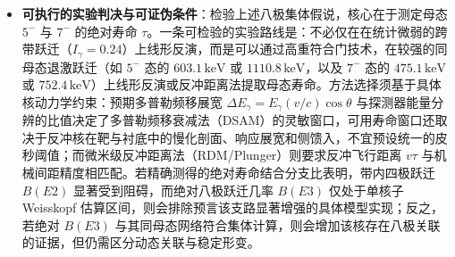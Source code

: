 \begin{itemize}
\item \textbf{可执行的实验判决与可证伪条件}：检验上述八极集体假说，核心在于测定母态 $5^-$ 与 $7^-$ 的绝对寿命 $\tau$。一条可检验的实验路线是：不必仅在在统计微弱的跨带跃迁（$I_\gamma = 0.24$）上线形反演，而是可以通过高重符合门技术，在较强的同母态退激跃迁（如 $5^-$ 态的 $603.1\,\mathrm{keV}$ 或 $1110.8\,\mathrm{keV}$，以及 $7^-$ 态的 $475.1\,\mathrm{keV}$ 或 $752.4\,\mathrm{keV}$）上线形反演或反冲距离法提取母态寿命。方法选择须基于具体核动力学约束：预期多普勒频移展宽 $\Delta E_\gamma = E_\gamma (v/c) \cos\theta$ 与探测器能量分辨的比值决定了多普勒频移衰减法（DSAM）的灵敏窗口，可用寿命窗口还取决于反冲核在靶与衬底中的慢化剖面、响应展宽和侧馈入，不宜预设统一的皮秒阈值；而微米级反冲距离法（RDM/Plunger）则要求反冲飞行距离 $v\tau$ 与机械间距精度相匹配。若精确测得的绝对寿命结合分支比表明，带内四极跃迁 $B(E2)$ 显著受到阻碍，而绝对八极跃迁几率 $B(E3)$ 仅处于单核子 Weisskopf 估算区间，则会排除预言该支路显著增强的具体模型实现；反之，若绝对 $B(E3)$ 与其同母态网络符合集体计算，则会增加该核存在八极关联的证据，但仍需区分动态关联与稳定形变。
\end{itemize}

